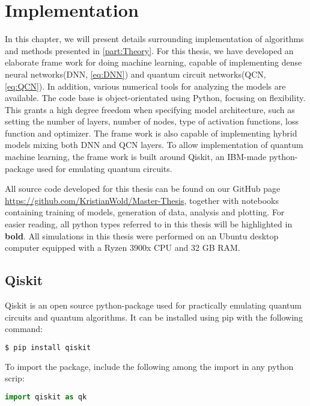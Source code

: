 \chapter{Implementation}\label{chap:implementation}
In this chapter, we will present details surrounding implementation of algorithms and methods presented in \cref{part:Theory}. For this thesis, we have developed an elaborate frame work for doing machine learning, capable of implementing dense neural networks(DNN, \cref{eq:DNN}) and quantum circuit networks(QCN, \cref{eq:QCN}). In addition, various numerical tools for analyzing the models are available. The code base is object-orientated using Python, focusing on flexibility. This grants a high degree freedom when specifying model architecture, such as setting the number of layers, number of nodes, type of activation functions, loss function and optimizer. The frame work is also capable of implementing hybrid models mixing both DNN and QCN layers. To allow implementation of quantum machine learning, the frame work is built around Qiskit\cite{Qiskit}, an IBM-made python-package used for emulating quantum circuits. 

All source code developed for this thesis can be found on our GitHub page \url{https://github.com/KristianWold/Master-Thesis}, together with notebooks containing training of models, generation of data, analysis and plotting. For easier reading, all python types referred to in this thesis will be highlighted in \textbf{bold}. All simulations in this thesis were performed on an Ubuntu desktop computer equipped with a Ryzen 3900x CPU and 32 GB RAM.

\section{Qiskit}\label{sec:Qiskit}

Qiskit\cite{Qiskit} is an open source python-package used for practically emulating quantum circuits and quantum algorithms. It can be installed using pip with the following command:

\begin{lstlisting}[language=bash]
  $ pip install qiskit
\end{lstlisting}
To import the package, include the following among the import in any python scrip:
\begin{lstlisting}[language=python]
  import qiskit as qk
\end{lstlisting}

